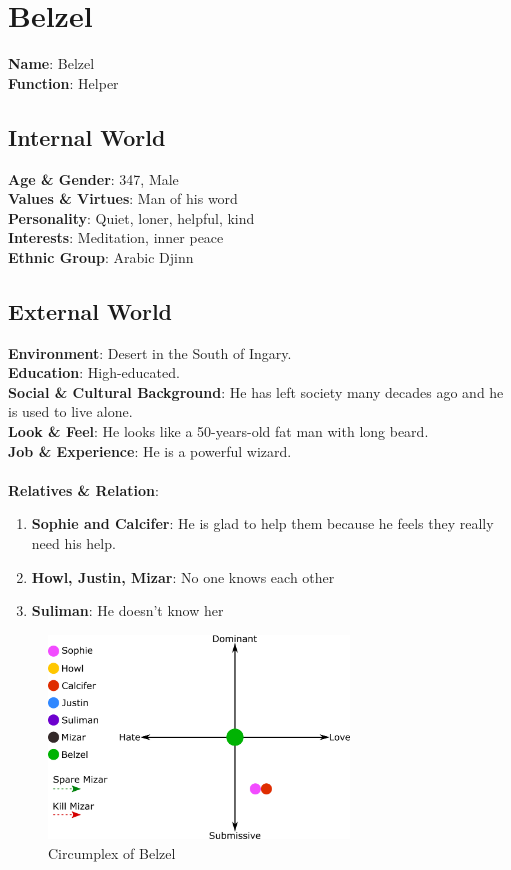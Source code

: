 \section{Belzel}

\textbf{Name}: Belzel \\
\textbf{Function}: Helper

\subsection{Internal World}

\textbf{Age \& Gender}: 347, Male \\
\textbf{Values \& Virtues}: Man of his word  \\
\textbf{Personality}: Quiet, loner, helpful, kind \\
\textbf{Interests}: Meditation, inner peace \\
\textbf{Ethnic Group}: Arabic Djinn

\subsection{External World}
\textbf{Environment}: Desert in the South of Ingary.  \\
\textbf{Education}: High-educated. \\
\textbf{Social \& Cultural Background}: He has left society many decades ago and he is used to live alone. \\
\textbf{Look \& Feel}: He looks like a 50-years-old fat man with long beard. \\
\textbf{Job \& Experience}: He is a powerful wizard. \\
\\
\textbf{Relatives \& Relation}:
\begin{enumerate}
\item \textbf{Sophie and Calcifer}: He  is glad to help them because he feels they really need his help.
\item \textbf{Howl, Justin, Mizar}: No one knows each other
\item \textbf{Suliman}: He doesn’t know her
\end{enumerate}

\begin{figure}
  \centering
  \includegraphics[width=8cm]{Images/Circumplexes/belzelCircumplex}
  \caption{Circumplex of Belzel}
\end{figure}

